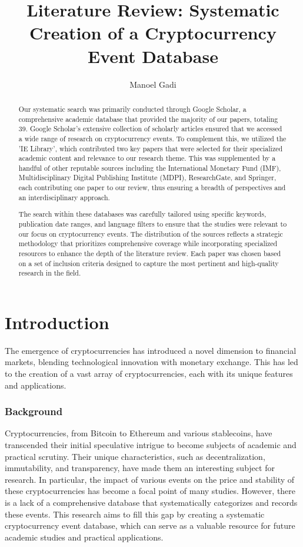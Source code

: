 \documentclass{article}
\title{Literature Review: Systematic Creation of a Cryptocurrency Event Database}
\author{Manoel Gadi}
\begin{document}
\maketitle

\begin{abstract}
Our systematic search was primarily conducted through Google Scholar, a comprehensive academic database that provided the majority of our papers, totaling 39. Google Scholar's extensive collection of scholarly articles ensured that we accessed a wide range of research on cryptocurrency events. To complement this, we utilized the 'IE Library', which contributed two key papers that were selected for their specialized academic content and relevance to our research theme. This was supplemented by a handful of other reputable sources including the International Monetary Fund (IMF), Multidisciplinary Digital Publishing Institute (MDPI), ResearchGate, and Springer, each contributing one paper to our review, thus ensuring a breadth of perspectives and an interdisciplinary approach.

The search within these databases was carefully tailored using specific keywords, publication date ranges, and language filters to ensure that the studies were relevant to our focus on cryptocurrency events. The distribution of the sources reflects a strategic methodology that prioritizes comprehensive coverage while incorporating specialized resources to enhance the depth of the literature review. Each paper was chosen based on a set of inclusion criteria designed to capture the most pertinent and high-quality research in the field.
\end{abstract}

\section{Introduction}

The emergence of cryptocurrencies has introduced a novel dimension to financial markets, blending technological innovation with monetary exchange. This has led to the creation of a vast array of cryptocurrencies, each with its unique features and applications.

\subsubsection{Background}

Cryptocurrencies, from Bitcoin to Ethereum and various stablecoins, have transcended their initial speculative intrigue to become subjects of academic and practical scrutiny. Their unique characteristics, such as decentralization, immutability, and transparency, have made them an interesting subject for research. In particular, the impact of various events on the price and stability of these cryptocurrencies has become a focal point of many studies. However, there is a lack of a comprehensive database that systematically categorizes and records these events. This research aims to fill this gap by creating a systematic cryptocurrency event database, which can serve as a valuable resource for future academic studies and practical applications.
\end{document}

